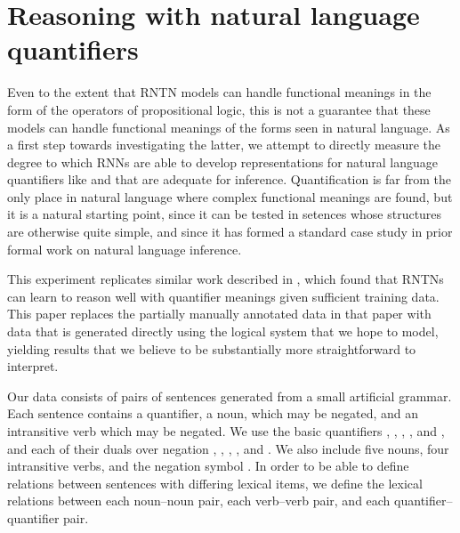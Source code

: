 \section{Reasoning with natural language quantifiers}

Even to the extent that RNTN models can handle functional meanings in the form of the operators of propositional logic, this is not a guarantee that these models can handle functional meanings of the forms seen in natural language. As a first step towards investigating the latter, we attempt to directly measure the degree to which RNNs are able to develop representations for natural language quantifiers like  and  that are adequate for inference. Quantification is far from the only place in natural language where complex functional meanings are found, but it is a natural starting point, since it can be tested in setences whose structures are otherwise quite simple, and since it has formed a standard case study in prior formal work on natural language inference.


This experiment replicates similar work described in \citet{bowman2013can}, which found that RNTNs can learn to reason well with quantifier meanings given sufficient training data. This paper replaces the partially manually annotated data in that paper with data that is generated directly using the logical system that we hope to model, yielding results that we believe to be substantially more straightforward to interpret.

Our data consists of pairs of sentences generated from a small artificial grammar. Each sentence contains a quantifier, a noun, which may be negated, and an intransitive verb which may be negated. We use the basic quantifiers , , , , and , and each of their duals over negation , , , , and . We also include five nouns, four intransitive verbs, and the negation symbol . In order to be able to define relations between sentences with differing lexical items, we define the lexical relations between each noun--noun pair, each verb--verb pair, and each quantifier--quantifier pair.


